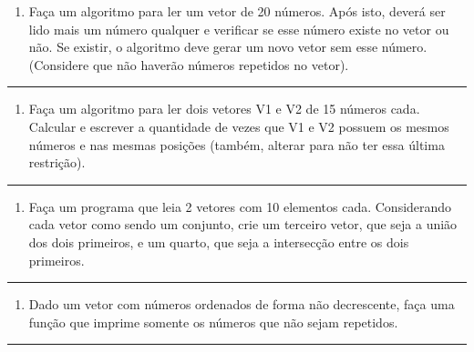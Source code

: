 \documentclass[12pt,a4paper]{article}
\providecommand{\tightlist}{%
      \setlength{\itemsep}{0pt}\setlength{\parskip}{0pt}}
\begin{document}
\begin{enumerate}
\def\labelenumi{\arabic{enumi}.}
\setcounter{enumi}{10}
\tightlist
\item
  Faça um algoritmo para ler um vetor de 20 números. Após isto, deverá
  ser lido mais um número qualquer e verificar se esse número existe no
  vetor ou não. Se existir, o algoritmo deve gerar um novo vetor sem
  esse número. (Considere que não haverão números repetidos no vetor).
\end{enumerate}

    \begin{center}\rule{0.5\linewidth}{0.5pt}\end{center}

\begin{enumerate}
\def\labelenumi{\arabic{enumi}.}
\setcounter{enumi}{11}
\tightlist
\item
  Faça um algoritmo para ler dois vetores V1 e V2 de 15 números cada.
  Calcular e escrever a quantidade de vezes que V1 e V2 possuem os
  mesmos números e nas mesmas posições (também, alterar para não ter
  essa última restrição).
\end{enumerate}

    \begin{center}\rule{0.5\linewidth}{0.5pt}\end{center}

\begin{enumerate}
\def\labelenumi{\arabic{enumi}.}
\setcounter{enumi}{12}
\tightlist
\item
  Faça um programa que leia 2 vetores com 10 elementos cada.
  Considerando cada vetor como sendo um conjunto, crie um terceiro
  vetor, que seja a união dos dois primeiros, e um quarto, que seja a
  intersecção entre os dois primeiros.
\end{enumerate}

    \begin{center}\rule{0.5\linewidth}{0.5pt}\end{center}

\begin{enumerate}
\def\labelenumi{\arabic{enumi}.}
\setcounter{enumi}{13}
\tightlist
\item
  Dado um vetor com números ordenados de forma não decrescente, faça uma
  função que imprime somente os números que não sejam repetidos.
\end{enumerate}

    \begin{center}\rule{0.5\linewidth}{0.5pt}\end{center}
\end{document}
